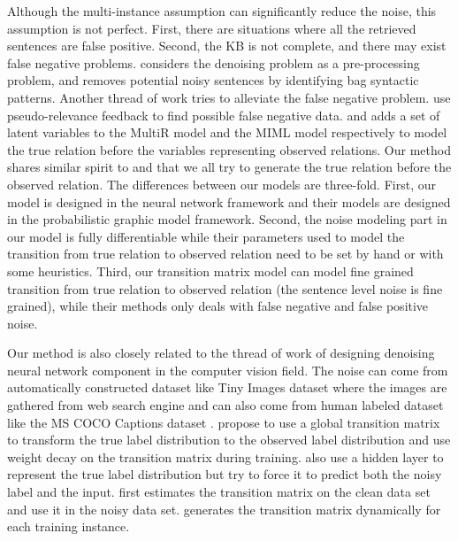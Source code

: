 \documentclass[11pt,a4paper]{article}
\begin{document}
Although the multi-instance assumption can significantly reduce the noise, this assumption is not perfect. First, there are situations where all the retrieved sentences are false positive. Second, the KB is not complete, and there may exist false negative problems. \cite{takamatsu2012reducing} considers the denoising problem as a pre-processing problem, and removes potential noisy sentences by identifying bag syntactic patterns.  Another thread of work tries to alleviate the false negative problem. \cite{xu2013filling} use pseudo-relevance feedback to find possible false negative data. \cite{ritter2013modeling} and \cite{min2013distant} adds a set of latent variables to the MultiR model \cite{hoffmann2011knowledge} and the MIML model \cite{surdeanu2012multi} respectively to model the true relation before the variables representing observed relations. Our method shares similar spirit to \cite{ritter2013modeling} and \cite{min2013distant} that we all try to generate the true relation before the observed relation. The differences between our models are three-fold. First, our model is designed in the neural network framework and their models are designed in the probabilistic graphic model framework. Second, the noise modeling part in our model is fully differentiable while their parameters used to model the transition from true relation to observed relation need to be set by hand or with some heuristics. Third, our transition matrix model can model fine grained transition from true relation to observed relation (the sentence level noise is fine grained), while their methods only deals with false negative and false positive noise.


Our method is also closely related to the thread of work of designing denoising neural network component in the computer vision field. The noise can come from automatically constructed dataset like Tiny Images dataset \cite{torralba200880} where the images are gathered from web search engine and can also come from human labeled dataset \cite{misra2016seeing} like the MS COCO Captions dataset \cite{chen2015microsoft}. \cite{sukhbaatar2014training} propose to use a global transition matrix to transform the true label distribution to the observed label distribution and use weight decay on the transition matrix during training. \cite{reed2014training} also use a hidden layer to represent the true label distribution but try to force it to predict both the noisy label and the input. \cite{chen2015webly,xiao2015learning} first estimates the transition matrix on the clean data set and use it in the noisy data set. \cite{misra2016seeing} generates the transition matrix dynamically for each training instance. 
\end{document}
